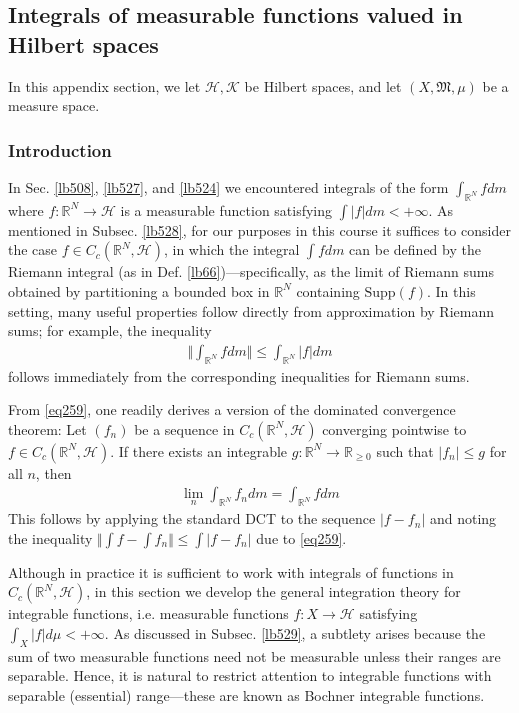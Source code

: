 \documentclass[12pt,b5paper,notitlepage]{article}
\theoremstyle{definition}
\theoremstyle{plain}
\newcommand{\fk}{\mathfrak}
\newcommand{\Rbb}{\mathbb R}
\newcommand{\Supp}{\mathrm{Supp}}
\newcommand{\MH}{\mathcal H}
\newcommand{\MK}{\mathcal K}
\numberwithin{equation}{section}
\begin{document}
\begin{subappendices}



\subsection{Integrals of measurable functions valued in Hilbert spaces}\label{lb498}



In this appendix section, we let $\MH,\MK$ be Hilbert spaces, and let $(X,\fk M,\mu)$ be a measure space.


\subsubsection{Introduction}

In Sec. \ref{lb508}, \ref{lb527}, and \ref{lb524} we encountered integrals of the form $\int_{\Rbb^N}fdm$ where $f:\Rbb^N\rightarrow\MH$ is a measurable function satisfying $\int |f|dm<+\infty$. As mentioned in Subsec. \ref{lb528}, for our purposes in this course it suffices to consider the case $f\in C_c(\Rbb^N,\MH)$, in which the integral $\int fdm$ can be defined by the Riemann integral (as in Def. \ref{lb66})---specifically, as the limit of Riemann sums obtained by partitioning a bounded box in $\mathbb{R}^N$ containing $\Supp(f)$. In this setting, many useful properties follow directly from approximation by Riemann sums; for example, the inequality
\begin{align}\label{eq259}
\Big\Vert\int_{\Rbb^N}fdm\Big\Vert\leq \int_{\Rbb^N}|f|dm
\end{align}
follows immediately from the corresponding inequalities for Riemann sums.

From \eqref{eq259}, one readily derives a version of the dominated convergence theorem: Let $(f_n)$ be a sequence in $C_c(\Rbb^N,\MH)$ converging pointwise to $f\in C_c(\Rbb^N,\MH)$. If there exists an integrable $g:\Rbb^N\rightarrow\Rbb_{\geq0}$ such that $|f_n|\leq g$ for all $n$, then
\begin{align*}
\lim_n\int_{\Rbb^N}f_ndm=\int_{\Rbb^N}fdm
\end{align*}
This follows by applying the standard DCT to the sequence $|f- f_n|$ and noting the inequality $\Vert \int f - \int f_n \Vert \leq \int |f - f_n|$ due to \eqref{eq259}.


Although in practice it is sufficient to work with integrals of functions in $C_c(\Rbb^N,\MH)$, in this section we develop the general integration theory for integrable functions, i.e. measurable functions $f:X\rightarrow\MH$ satisfying $\int_X|f|d\mu<+\infty$. As discussed in Subsec. \ref{lb529}, a subtlety arises because the sum of two measurable functions need not be measurable unless their ranges are separable.
Hence, it is natural to restrict attention to integrable functions with separable (essential) range---these are known as Bochner integrable functions.












\end{subappendices}
\end{document}
